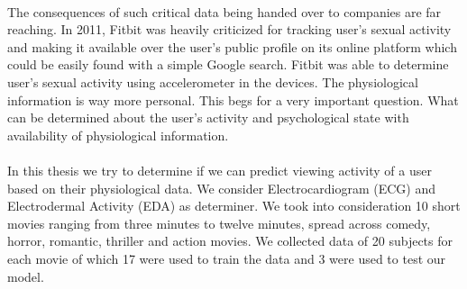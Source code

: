 \paragraph{}
The consequences of such critical data being handed over to companies are far reaching. In 2011, Fitbit was heavily criticized for tracking user’s sexual activity and making it available over the user’s public profile on its online platform which could be easily found with a simple Google search.\cite{Fitbit} Fitbit was able to determine user’s sexual activity using accelerometer in the devices. The physiological information is way more personal.
This begs for a very important question. What can be determined about the user’s activity and psychological state with availability of physiological information.
\paragraph{}
In this thesis we try to determine if we can predict viewing activity of a user based on their physiological data. We consider Electrocardiogram (ECG) and Electrodermal Activity (EDA) as determiner. We took into consideration 10 short movies ranging from three minutes to twelve minutes, spread across comedy, horror, romantic, thriller and action movies. We collected data of 20 subjects for each movie of which 17 were used to train the data and 3 were used to test our model. 